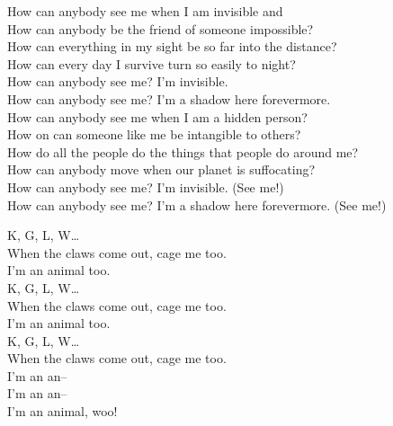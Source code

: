 


How can anybody see me when I am invisible and \\
How can anybody be the friend of someone impossible? \\
How can everything in my sight be so far into the distance? \\
How can every day I survive turn so easily to night? \\

How can anybody see me? I'm invisible. \\
How can anybody see me? I'm a shadow here forevermore. \\

How can anybody see me when I am a hidden person? \\
How on  can someone like me be intangible to others? \\
How do all the people do the things that people do around me? \\
How can anybody move when our planet is suffocating? \\

How can anybody see me? I'm invisible. (See me!) \\
How can anybody see me? I'm a shadow here forevermore. (See me!) \\




K, G, L, W… \\

When the claws come out, cage me too. \\
I'm an animal too. \\

K, G, L, W… \\

When the claws come out, cage me too. \\
I'm an animal too. \\

K, G, L, W… \\

When the claws come out, cage me too. \\
I'm an an-- \\
I'm an an-- \\
I'm an animal, woo! \\

